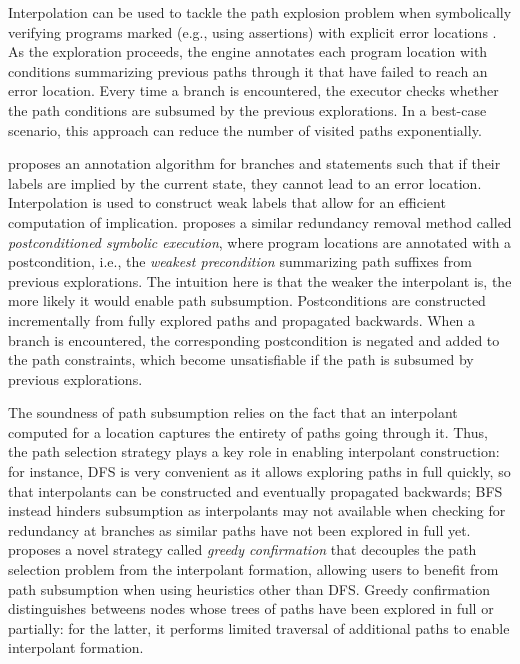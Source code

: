 { Interpolation can be used to tackle the path explosion problem when symbolically verifying programs marked (e.g., using assertions) with explicit error locations . As the exploration proceeds, the engine annotates each program location with conditions summarizing previous paths through it that have failed to reach an error location. Every time a branch is encountered, the executor checks whether the path conditions are subsumed by the previous explorations. In a best-case scenario, this approach can reduce the number of visited paths exponentially. %

\cite{McMillan10} proposes an annotation algorithm for branches and statements such that if their labels are implied by the current state, they cannot lead to an error location. Interpolation is used to construct weak labels that allow for an efficient computation of implication. \cite{YYG15} proposes a similar redundancy removal method called {\em postconditioned symbolic execution}, where  program locations are annotated with a postcondition, i.e., the {\em weakest precondition} summarizing path suffixes from previous explorations. The intuition here is that the weaker the interpolant is, the more likely it would enable path subsumption. Postconditions are constructed incrementally from fully explored paths and propagated backwards. When a branch is encountered, the corresponding postcondition is negated and added to the path constraints, which become unsatisfiable if the path is subsumed by previous explorations.

The soundness of path subsumption relies on the fact that an interpolant computed for a location captures the entirety of paths going through it. Thus, the path selection strategy plays a key role in enabling interpolant construction: for instance, DFS is very convenient as it allows exploring paths in full quickly, so that interpolants can be constructed and eventually propagated backwards; BFS instead hinders subsumption as interpolants may not available when checking for redundancy at branches as similar paths have not been explored in full yet. \cite{JMN13} proposes a novel strategy called {\em greedy confirmation} that decouples the path selection problem from the interpolant formation, allowing users to benefit from path subsumption when using heuristics other than DFS. Greedy confirmation distinguishes betweens nodes whose trees of paths have been explored in full or partially: for the latter, it performs limited traversal of additional paths to enable interpolant formation.

}
